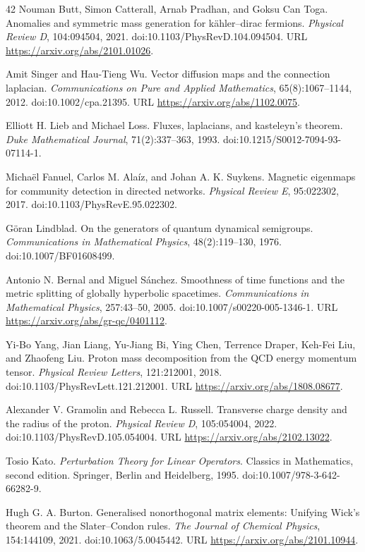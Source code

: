 \documentclass[11pt,letterpaper]{article}
\begin{document}
\begin{thebibliography}{42}
Nouman Butt, Simon Catterall, Arnab Pradhan, and Goksu Can Toga.
Anomalies and symmetric mass generation for k\"ahler--dirac fermions.
\emph{Physical Review D}, 104:094504, 2021.
doi:10.1103/PhysRevD.104.094504.
URL \url{https://arxiv.org/abs/2101.01026}.

Amit Singer and Hau-Tieng Wu.
Vector diffusion maps and the connection laplacian.
\emph{Communications on Pure and Applied Mathematics}, 65(8):1067--1144, 2012.
doi:10.1002/cpa.21395.
URL \url{https://arxiv.org/abs/1102.0075}.

Elliott H. Lieb and Michael Loss.
Fluxes, laplacians, and kasteleyn's theorem.
\emph{Duke Mathematical Journal}, 71(2):337--363, 1993.
doi:10.1215/S0012-7094-93-07114-1.

Micha\"el Fanuel, Carlos M. Ala\'iz, and Johan A. K. Suykens.
Magnetic eigenmaps for community detection in directed networks.
\emph{Physical Review E}, 95:022302, 2017.
doi:10.1103/PhysRevE.95.022302.

G\"oran Lindblad.
On the generators of quantum dynamical semigroups.
\emph{Communications in Mathematical Physics}, 48(2):119--130, 1976.
doi:10.1007/BF01608499.

Antonio N. Bernal and Miguel S\'anchez.
Smoothness of time functions and the metric splitting of globally hyperbolic
spacetimes.
\emph{Communications in Mathematical Physics}, 257:43--50, 2005.
doi:10.1007/s00220-005-1346-1.
URL \url{https://arxiv.org/abs/gr-qc/0401112}.

Yi-Bo Yang, Jian Liang, Yu-Jiang Bi, Ying Chen, Terrence Draper, Keh-Fei Liu,
and Zhaofeng Liu.
Proton mass decomposition from the QCD energy momentum tensor.
\emph{Physical Review Letters}, 121:212001, 2018.
doi:10.1103/PhysRevLett.121.212001.
URL \url{https://arxiv.org/abs/1808.08677}.

Alexander V. Gramolin and Rebecca L. Russell.
Transverse charge density and the radius of the proton.
\emph{Physical Review D}, 105:054004, 2022.
doi:10.1103/PhysRevD.105.054004.
URL \url{https://arxiv.org/abs/2102.13022}.

Tosio Kato.
\emph{Perturbation Theory for Linear Operators}.
Classics in Mathematics, second edition.
Springer, Berlin and Heidelberg, 1995.
doi:10.1007/978-3-642-66282-9.

Hugh G. A. Burton.
Generalised nonorthogonal matrix elements: Unifying Wick's theorem and the
Slater--Condon rules.
\emph{The Journal of Chemical Physics}, 154:144109, 2021.
doi:10.1063/5.0045442.
URL \url{https://arxiv.org/abs/2101.10944}.


\end{thebibliography}
\end{document}
